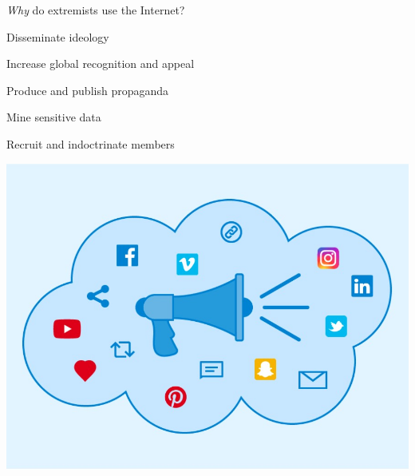 \documentclass[nobackground,dvipsnames,table]{beamer}
\begin{document}
\begin{frame}{\emph{Why} do extremists use the Internet?}

\begin{minipage}[b]{0.4\textwidth}
    \raggedright %
    \small{
    \begin{itemize}
    \footnotesize{
        \item Disseminate ideology
        \item Increase global recognition and appeal
        \item Produce and publish propaganda
        \item Mine sensitive data
        \item Recruit and indoctrinate members
        }
    \end{itemize} 
    }
\end{minipage}
\hfill
\includegraphics[scale=0.3]{img/fig1.jpg}

\end{frame}
\end{document}
